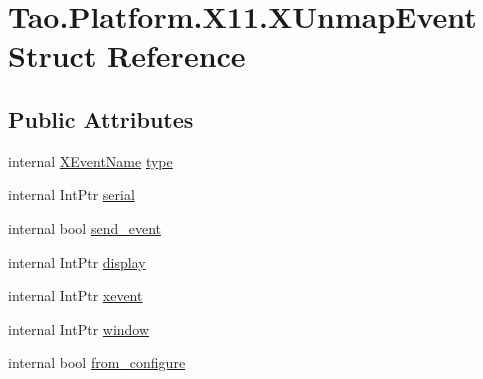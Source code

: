 \hypertarget{struct_tao_1_1_platform_1_1_x11_1_1_x_unmap_event}{
\section{Tao.Platform.X11.XUnmapEvent Struct Reference}
\label{struct_tao_1_1_platform_1_1_x11_1_1_x_unmap_event}
}
\subsection*{Public Attributes}
\begin{DoxyCompactItemize}
\item 
internal \hyperlink{namespace_tao_1_1_platform_1_1_x11_aff81ed5b8778e1ea8e872861dff9f146}{XEventName} \hyperlink{struct_tao_1_1_platform_1_1_x11_1_1_x_unmap_event_a690adc5e65849baf146d386c88fbf21c}{type}
\item 
internal IntPtr \hyperlink{struct_tao_1_1_platform_1_1_x11_1_1_x_unmap_event_a2ae81f49e4a294e84b498536555f9113}{serial}
\item 
internal bool \hyperlink{struct_tao_1_1_platform_1_1_x11_1_1_x_unmap_event_a06be146eace6aa960e5e9f4b026a724e}{send\_\-event}
\item 
internal IntPtr \hyperlink{struct_tao_1_1_platform_1_1_x11_1_1_x_unmap_event_a3c76c1f872593af19bd5b6b84fcbf2b1}{display}
\item 
internal IntPtr \hyperlink{struct_tao_1_1_platform_1_1_x11_1_1_x_unmap_event_a17a6139fa66738054e47c58ff68c8512}{xevent}
\item 
internal IntPtr \hyperlink{struct_tao_1_1_platform_1_1_x11_1_1_x_unmap_event_acedd6ca4a0c800ffc11cd1f5abaae120}{window}
\item 
internal bool \hyperlink{struct_tao_1_1_platform_1_1_x11_1_1_x_unmap_event_aa71cc41e30b73a14a708bc6cb12ed696}{from\_\-configure}
\end{DoxyCompactItemize}


